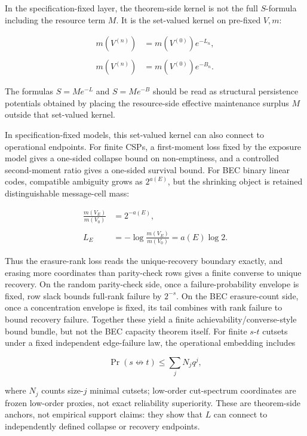 \documentclass[12pt,a4paper]{article}
\begin{document}
In the specification-fixed layer, the theorem-side kernel is not the full \(S\)-formula including the resource term \(M\). It is the set-valued kernel on pre-fixed \(V,m\):

\[
\begin{aligned}
m(V^{(n)})&=m(V^{(0)})e^{-L_{n}}, \\
\qquad \\
m(V^{(n)})&=m(V^{(0)})e^{-B_{n}}.
\end{aligned}
\]

The formulas \(S=Me^{-L}\) and \(S=Me^{-B}\) should be read as structural persistence potentials obtained by placing the resource-side effective maintenance surplus \(M\) outside that set-valued kernel.

In specification-fixed models, this set-valued kernel can also connect to operational endpoints. For finite CSPs, a first-moment loss fixed by the exposure model gives a one-sided collapse bound on non-emptiness, and a controlled second-moment ratio gives a one-sided survival bound. For BEC binary linear codes, compatible ambiguity grows as \(2^{a(E)}\), but the shrinking object is retained distinguishable message-cell mass:

\[
\begin{aligned}
\frac{m(V_{E})}{m(V_0)}&=2^{-a(E)}, \\
\qquad \\
L_{E}&=-\log\frac{m(V_{E})}{m(V_0)}=a(E)\log 2.
\end{aligned}
\]

Thus the erasure-rank loss reads the unique-recovery boundary exactly, and erasing more coordinates than parity-check rows gives a finite converse to unique recovery. On the random parity-check side, once a failure-probability envelope is fixed, row slack bounds full-rank failure by \(2^{-s}\). On the BEC erasure-count side, once a concentration envelope is fixed, its tail combines with rank failure to bound recovery failure. Together these yield a finite achievability/converse-style bound bundle, but not the BEC capacity theorem itself. For finite \(s\)-\(t\) cutsets under a fixed independent edge-failure law, the operational embedding includes

\[
\Pr(s\not\leftrightarrow t)\le \sum_{j} N_{j} q^j,
\]

where \(N_{j}\) counts size-\(j\) minimal cutsets; low-order cut-spectrum coordinates are frozen low-order proxies, not exact reliability superiority. These are theorem-side anchors, not empirical support claims: they show that \(L\) can connect to independently defined collapse or recovery endpoints.
\end{document}
